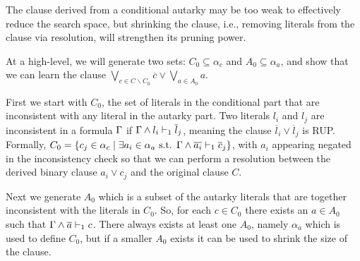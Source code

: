 The \pr clause derived from a conditional autarky may be too weak to effectively reduce the search space, 
but shrinking the \pr clause, i.e., removing literals from the clause via resolution, will strengthen its pruning power. 

At a high-level, we will generate two sets: $C_0 \subseteq \alpha_c$ and $A_0
\subseteq \alpha_a$, and show that we can learn the \pr clause $\bigvee_{c \in C
\backslash C_0} \overline{c} \lor \bigvee_{a \in A_0} a$. 

First we start with $C_0$, the set of literals in the conditional part that are
inconsistent with any literal in the autarky part. Two literals $l_i$ and $l_j$
are inconsistent in a formula $\Gamma$ if
$\Gamma \land l_i \vdash_1 \overline{l}_j$, meaning the clause
$\overline{l}_i \lor \overline{l}_j$ is RUP. Formally, $C_0 = \{c_j \in \alpha_c
\mid \exists a_i \in \alpha_a \text{ s.t. }
\Gamma \land \overline{a_i} \vdash_1 \overline{c}_j \}$, with $a_i$ appearing negated
in the inconsistency check so that we can perform a resolution between the
derived binary clause  $a_i \lor c_j$ and the original \pr clause $C$.

Next we generate $A_0$ which is a subset of the autarky literals that are
together inconsistent with the literals in $C_0$. So, for each $c \in C_0$ there
exists an $a \in A_0$ such that $\Gamma \land \overline{a} \vdash_1 c$. There always
exists at least one $A_0$, namely $\alpha_a$ which is used to define $C_0$, but
if a smaller $A_0$ exists it can be used to shrink the size of the \pr clause. 


